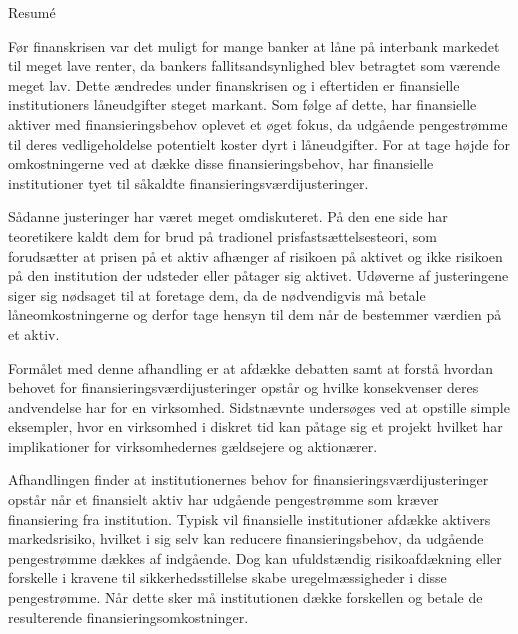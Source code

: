 \documentclass[main.tex]{subfiles}
\begin{document}
    \thispagestyle{empty}
    \begin{adjustwidth}{-1cm}{-1cm}
    \begin{center}
    {\LARGE Resumé}
    \end{center}

    Før finanskrisen var det muligt for mange banker at låne 
    på interbank markedet til meget lave renter, 
    da bankers fallitsandsynlighed blev betragtet som værende meget lav.
    Dette ændredes under finanskrisen og i eftertiden er finansielle institutioners 
    låneudgifter steget markant.
    Som følge af dette, har finansielle aktiver med finansieringsbehov oplevet et øget fokus, 
    da udgående pengestrømme til deres vedligeholdelse potentielt koster dyrt i låneudgifter.
    For at tage højde for omkostningerne ved at dække disse finansieringsbehov,
    har finansielle institutioner tyet til såkaldte finansieringsværdijusteringer.

    Sådanne justeringer har været meget omdiskuteret. 
    På den ene side har teoretikere kaldt dem for brud på tradionel prisfastsættelsesteori,
    som forudsætter at prisen på et aktiv afhænger af risikoen på aktivet 
    og ikke risikoen på den institution der udsteder eller påtager sig aktivet.
    Udøverne af justeringene siger sig nødsaget til at foretage dem,
    da de nødvendigvis må betale låneomkostningerne 
    og derfor tage hensyn til dem når de bestemmer værdien på et aktiv. 

    Formålet med denne afhandling er at afdække debatten
    samt at forstå hvordan behovet for finansieringsværdijusteringer opstår 
    og hvilke konsekvenser deres andvendelse har for en virksomhed.
    Sidstnævnte undersøges ved at opstille simple eksempler,
    hvor en virksomhed i diskret tid kan påtage sig et projekt
    hvilket har implikationer for virksomhedernes gældsejere og aktionærer.

    Afhandlingen finder at institutionernes behov for finansieringsværdijusteringer opstår 
    når et finansielt aktiv har udgående pengestrømme som kræver finansiering fra institution.
    Typisk vil finansielle institutioner afdække aktivers markedsrisiko,
    hvilket i sig selv kan reducere finansieringsbehov, da udgående pengestrømme dækkes af indgående.
    Dog kan ufuldstændig risikoafdækning eller forskelle i kravene til sikkerhedsstillelse
    skabe uregelmæssigheder i disse pengestrømme. 
    Når dette sker må institutionen dække forskellen 
    og betale de resulterende finansieringsomkostninger.
    

\end{adjustwidth}
\end{document}

